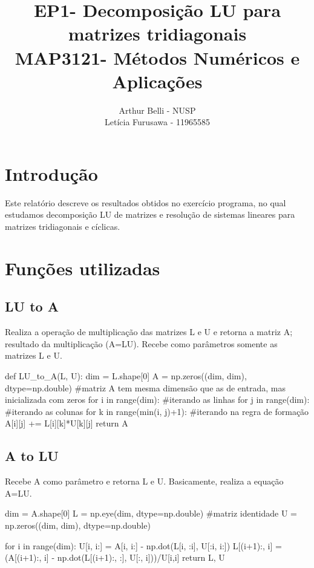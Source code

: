 \documentclass{article}
\title{\textbf{EP1}- Decomposição LU para matrizes tridiagonais \newline \\

 \large MAP3121- Métodos Numéricos e Aplicações \\
}
\author{Arthur Belli - NUSP \newline \\  Letícia Furusawa - 11965585}
\begin{document}
\maketitle


\section{Introdução}

Este relatório descreve os resultados obtidos no exercício programa, no qual estudamos decomposição LU de matrizes e resolução de sistemas lineares para matrizes tridiagonais e cíclicas. 

\section {Funções utilizadas}

\subsection{LU to A}

Realiza a operação de multiplicação das matrizes L e U e retorna a matriz A; resultado da multiplicação (A=LU). 
Recebe como parâmetros somente as matrizes L e U. 

\begin{python}
def LU_to_A(L, U):
    dim = L.shape[0]
    A = np.zeros((dim, dim), dtype=np.double) #matriz A tem mesma dimensão que as de entrada, mas inicializada com zeros
    for i in range(dim): #iterando as linhas
        for j in range(dim): #iterando as colunas
            for k in range(min(i, j)+1): #iterando na regra de formação
                A[i][j] += L[i][k]*U[k][j]
    return A
\end{python}

\subsection {A to LU}

Recebe A como parâmetro e retorna L e U. Basicamente, realiza a equação A=LU. 

\begin{python}
  dim = A.shape[0]
    L = np.eye(dim, dtype=np.double) #matriz identidade
    U = np.zeros((dim, dim), dtype=np.double)

    for i in range(dim):
        U[i, i:] = A[i, i:] - np.dot(L[i, :i], U[:i, i:])
        L[(i+1):, i] = (A[(i+1):, i] - np.dot(L[(i+1):, :], U[:, i]))/U[i,i]
    return L, U
\end{python}
\end{document}
